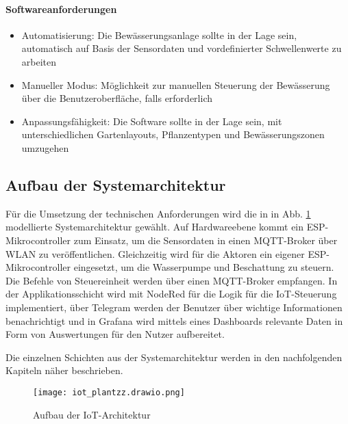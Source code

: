 \paragraph{Softwareanforderungen}
\begin{itemize}
\item Automatisierung: Die Bewässerungsanlage sollte in der Lage sein, automatisch auf Basis der Sensordaten und vordefinierter Schwellenwerte zu arbeiten
\item Manueller Modus: Möglichkeit zur manuellen Steuerung der Bewässerung über die Benutzeroberfläche, falls erforderlich
\item Anpassungsfähigkeit: Die Software sollte in der Lage sein, mit unterschiedlichen Gartenlayouts, Pflanzentypen und Bewässerungszonen umzugehen
\end{itemize}


\subsection{Aufbau der Systemarchitektur}

Für die Umsetzung der technischen Anforderungen wird die in in Abb. \ref{fig:iotschichten} modellierte Systemarchitektur gewählt. 
Auf Hardwareebene kommt ein ESP-Mikrocontroller zum Einsatz, um die Sensordaten in einen MQTT-Broker über WLAN zu veröffentlichen. 
Gleichzeitig wird für die Aktoren ein eigener ESP-Mikrocontroller eingesetzt, um die Wasserpumpe und Beschattung zu steuern. Die Befehle von Steuereinheit werden über einen MQTT-Broker empfangen.
In der Applikationsschicht wird mit NodeRed für die Logik für die IoT-Steuerung implementiert, über Telegram werden der Benutzer über wichtige Informationen benachrichtigt und in Grafana wird mittels eines Dashboards relevante Daten in Form von Auswertungen für den Nutzer aufbereitet.

Die einzelnen Schichten aus der Systemarchitektur werden in den nachfolgenden Kapiteln näher beschrieben.

\begin{figure}[htbp]
  \centering
  \texttt{[image: iot\_plantzz.drawio.png]}
  \caption{Aufbau der IoT-Architektur}\label{fig:iotschichten}
\end{figure}